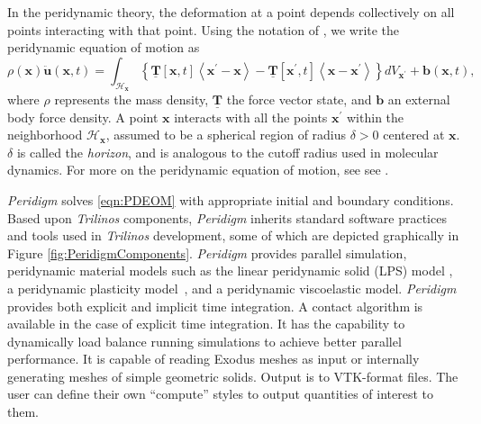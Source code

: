 \documentclass[pdf,ps2pdf,12pt,report]{SANDreport}
\theoremstyle{plain}
\theoremstyle{definition}
\theoremstyle{remark}
\numberwithin{equation}{section}
\begin{document}
In the peridynamic theory, the deformation at a point depends collectively on all points interacting with that point. Using the notation of \cite{Silling:2007:PDStates}, we write the peridynamic equation of motion as
\begin{equation} \label{eqn:PDEOM}
\rho(\mathbf{x}) \ddot{\mathbf{u}}(\mathbf{x},t) = \int_{\mathcal{H}_{\mathbf{x}}}
\left\{ \underline{\mathbf{T}}\left[ \mathbf{x},t \right]\left<\mathbf{x}^{\prime}-\mathbf{x} \right>
 - \underline{\mathbf{T}}\left[\mathbf{x}^{\prime},t \right]\left<\mathbf{x}-\mathbf{x}^{\prime} \right> \right\}
{d}V_{\mathbf{x}^\prime} + \mathbf{b}(\mathbf{x},t),
\end{equation}
where $\rho$ represents the mass density, $\underline{\mathbf{T}}$ the force vector state, and $\mathbf{b}$ an external body force density. A point $\mathbf{x}$ interacts with all the points $\mathbf{x}^{\prime}$ within the neighborhood $\mathcal{H}_{\mathbf{x}}$, assumed to be a spherical region of radius $\delta>0$ centered at $\mathbf{x}$. $\delta$ is called the {\em horizon}, and is analogous to the cutoff radius used in molecular dynamics. For more on the peridynamic equation of motion, see see \cite{Silling:2007:PDStates}.

\emph{Peridigm} solves \eqref{eqn:PDEOM} with appropriate initial and boundary conditions. Based upon \emph{Trilinos} components, \emph{Peridigm} inherits standard software practices and tools used in \emph{Trilinos} development, some of which are depicted graphically in Figure \ref{fig:PeridigmComponents}. \emph{Peridigm} provides parallel simulation, peridynamic material models such as the linear peridynamic solid (LPS) model \cite{Silling:2007:PDStates}, a peridynamic plasticity model~\cite{Mitchell:2011:Plasticity}, and a peridynamic viscoelastic model. \emph{Peridigm} provides both explicit and implicit time integration.  A contact algorithm is available in the case of explicit time integration.  It has the capability to dynamically load balance running simulations to achieve better parallel performance. It is capable of reading Exodus meshes as input or internally generating meshes of simple geometric solids. Output is to VTK-format files. The user can define their own ``compute'' styles to output quantities of interest to them.
\end{document}
